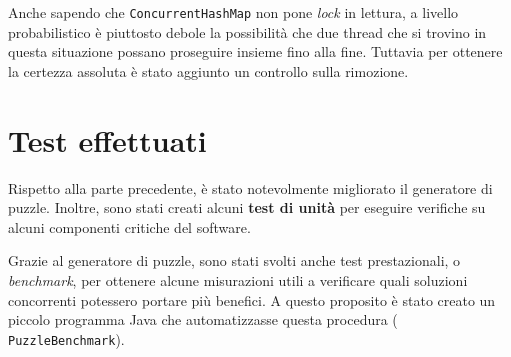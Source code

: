 \documentclass[a4paper, 12pt]{article}
\newcommand{\strong}[1]{ \textbf{#1}}
\begin{document}
Anche sapendo che \verb|ConcurrentHashMap| non pone \emph{lock} in lettura, a
livello probabilistico è piuttosto debole la possibilità che due thread che si
trovino in questa situazione possano proseguire insieme fino alla fine. Tuttavia
per ottenere la certezza assoluta è stato aggiunto un controllo sulla rimozione.

\section{Test effettuati}

Rispetto alla parte precedente, è stato notevolmente migliorato il generatore di
puzzle. Inoltre, sono stati creati alcuni \strong{test di unità} per eseguire
verifiche su alcuni componenti critiche del software.

Grazie al generatore di puzzle, sono stati svolti anche test prestazionali, o
\emph{benchmark}, per ottenere alcune misurazioni utili a verificare quali
soluzioni concorrenti potessero portare più benefici. A questo proposito è stato
creato un piccolo programma Java che automatizzasse questa procedura (
\verb|PuzzleBenchmark|).



\end{document}
